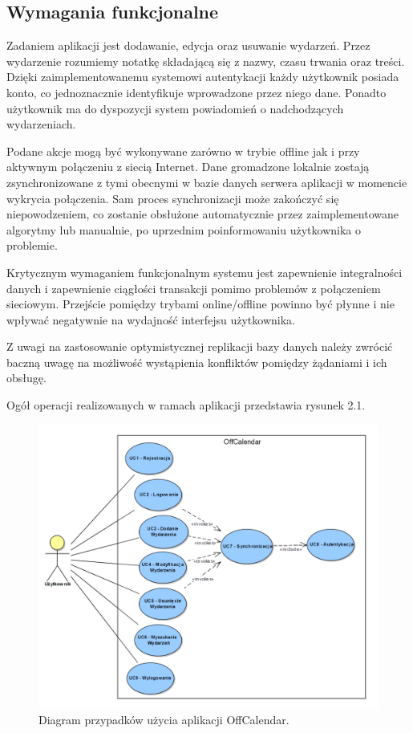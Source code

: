 \subsection{Wymagania funkcjonalne}
\label{sec:wymFunkcj}

Zadaniem aplikacji jest dodawanie, edycja oraz usuwanie wydarzeń. Przez wydarzenie rozumiemy notatkę składającą się z nazwy, czasu trwania oraz treści. Dzięki zaimplementowanemu systemowi autentykacji każdy użytkownik posiada konto, co jednoznacznie identyfikuje wprowadzone przez niego dane. Ponadto użytkownik ma do dyspozycji system powiadomień o nadchodzących wydarzeniach.

Podane akcje mogą być wykonywane zarówno w trybie offline jak i przy aktywnym połączeniu z siecią Internet. Dane gromadzone lokalnie zostają zsynchronizowane z tymi obecnymi w bazie danych serwera aplikacji w momencie wykrycia połączenia. Sam proces synchronizacji może zakończyć się niepowodzeniem, co zostanie obsłużone automatycznie przez zaimplementowane algorytmy lub manualnie, po uprzednim poinformowaniu użytkownika o problemie.

Krytycznym wymaganiem funkcjonalnym systemu jest zapewnienie integralności danych i zapewnienie ciągłości transakcji pomimo problemów z połączeniem sieciowym. Przejście pomiędzy trybami online/offline powinno być płynne i nie wpływać negatywnie na wydajność interfejsu użytkownika.

Z uwagi na zastosowanie optymistycznej replikacji bazy danych należy zwrócić baczną uwagę na możliwość wystąpienia konfliktów pomiędzy żądaniami i ich obsługę.

Ogół operacji realizowanych w ramach aplikacji przedstawia rysunek 2.1.

\begin{figure}[H]
\centering
\includegraphics[width=1.0\textwidth]{offcalendar_usecase.png}
\caption{Diagram przypadków użycia aplikacji OffCalendar.}
\end{figure}

